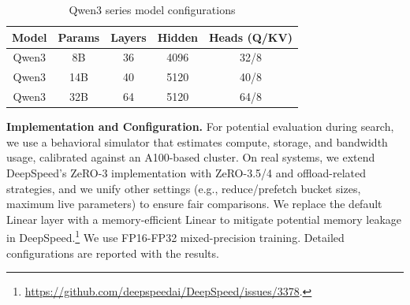 \documentclass[letterpaper,twocolumn,10pt]{article}
\begin{document}
\begin{table}[h]
  \centering
  \caption{Qwen3 series model configurations}
  \vspace{-0.5em}
  \label{tab:qwen3_params}
  \begin{tabular}{ccccc}
    \toprule
    Model & Params & Layers & Hidden & Heads (Q/KV) \\
    \midrule
    Qwen3  & 8B  & 36 & 4096  & 32/8 \\
    Qwen3 & 14B & 40 & 5120 & 40/8 \\
    Qwen3 & 32B & 64 & 5120 & 64/8 \\
    \bottomrule
  \end{tabular}
  \vspace{-1em}
\end{table}

\textbf{Implementation and Configuration.} For potential evaluation during search, we use a behavioral simulator that estimates compute, storage, and bandwidth usage, calibrated against an A100-based cluster. On real systems, we extend DeepSpeed's ZeRO-3 implementation with ZeRO-3.5/4 and offload-related strategies, and we unify other settings (e.g., reduce/prefetch bucket sizes, maximum live parameters) to ensure fair comparisons. We replace the default Linear layer with a memory-efficient Linear to mitigate potential memory leakage in DeepSpeed.\footnote{\url{https://github.com/deepspeedai/DeepSpeed/issues/3378}.} We use FP16-FP32 mixed-precision training. Detailed configurations are reported with the results. 

\end{document}
